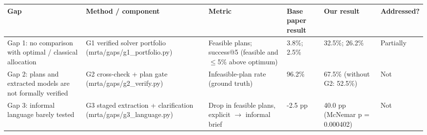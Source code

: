 \begin{tabular}{llllll}
\toprule
Gap & Method / component & Metric & Base paper result & Our result & Addressed? \\
\midrule
Gap 1: no comparison with optimal / classical allocation & G1 verified solver portfolio (mrta/gaps/g1\_portfolio.py) & Feasible plans; success@5 (feasible and $\le$5\% above optimum) & 3.8\%; 2.5\% & 32.5\%; 26.2\% & Partially \\
Gap 2: plans and extracted models are not formally verified & G2 cross-check + plan gate (mrta/gaps/g2\_verify.py) & Infeasible-plan rate (ground truth) & 96.2\% & 67.5\% (without G2: 52.5\%) & Not \\
Gap 3: informal language barely tested & G3 staged extraction + clarification (mrta/gaps/g3\_language.py) & Drop in feasible plans, explicit $\rightarrow$ informal brief & -2.5 pp & 40.0 pp (McNemar p = 0.000402) & Not \\
\bottomrule
\end{tabular}
